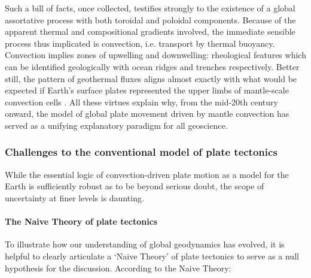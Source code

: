 \documentclass[a4paper,11pt,oneside]{book}
\begin{document}
Such a bill of facts, once collected, testifies strongly to the existence of a global assortative process with both toroidal and poloidal components. Because of the apparent thermal and compositional gradients involved, the immediate sensible process thus implicated is convection, i.e. transport by thermal buoyancy. Convection implies zones of upwelling and downwelling: rheological features which can be identified geologically with ocean ridges \cite{Macdonald1998-az} and trenches \cite{Arculus2019-aa} respectively. Better still, the pattern of geothermal fluxes aligns almost exactly with what would be expected if Earth's surface plates represented the upper limbs of mantle-scale convection cells \cite{Bennett2008-hw}. All these virtues explain why, from the mid-20th century onward, the model of global plate movement driven by mantle convection has served as a unifying explanatory paradigm for all geoscience.

\subsubsection{Challenges to the conventional model of plate tectonics}

While the essential logic of convection-driven plate motion as a model for the Earth is sufficiently robust as to be beyond serious doubt, the scope of uncertainty at finer levels is daunting.

\paragraph{The Naive Theory of plate tectonics}

To illustrate how our understanding of global geodynamics has evolved, it is helpful to clearly articulate a `Naive Theory' of plate tectonics to serve as a null hypothesis for the discussion. According to the Naive Theory:
\end{document}

